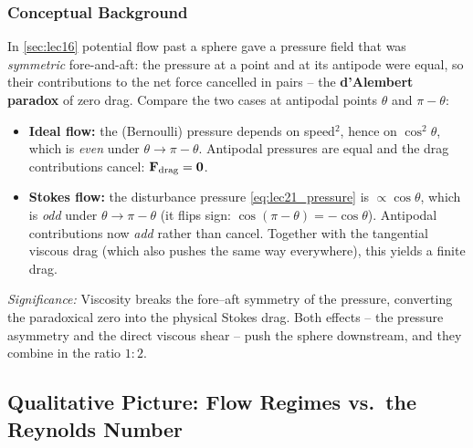 \documentclass[../main.tex]{subfiles}
\begin{document}
\subsubsection*{Conceptual Background}
In \cref{sec:lec16} potential flow past a sphere gave a pressure field that was \emph{symmetric} fore-and-aft: the pressure at a point and at its antipode were equal, so their contributions to the net force cancelled in pairs -- the \textbf{d'Alembert paradox} of zero drag. Compare the two cases at antipodal points $\theta$ and $\pi-\theta$:
\begin{itemize}
  \item \textbf{Ideal flow:} the (Bernoulli) pressure depends on speed$^2$, hence on $\cos^2\theta$, which is \emph{even} under $\theta\to\pi-\theta$. Antipodal pressures are equal and the drag contributions cancel: $\mathbf{F}_{\text{drag}}=\mathbf{0}$.
  \item \textbf{Stokes flow:} the disturbance pressure \eqref{eq:lec21_pressure} is $\propto\cos\theta$, which is \emph{odd} under $\theta\to\pi-\theta$ (it flips sign: $\cos(\pi-\theta)=-\cos\theta$). Antipodal contributions now \emph{add} rather than cancel. Together with the tangential viscous drag (which also pushes the same way everywhere), this yields a finite drag.
\end{itemize}
\textit{Significance:} Viscosity breaks the fore--aft symmetry of the pressure, converting the paradoxical zero into the physical Stokes drag. Both effects -- the pressure asymmetry and the direct viscous shear -- push the sphere downstream, and they combine in the ratio $1:2$.

\subsection{Qualitative Picture: Flow Regimes vs.\ the Reynolds Number}\label{sec:lec21:regimes}
\end{document}
